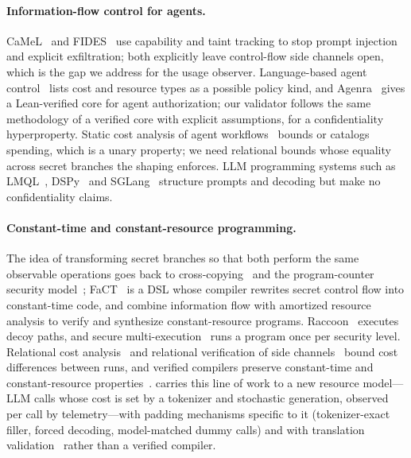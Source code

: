 \paragraph{Information-flow control for agents.} CaMeL~\cite{debenedetti2025camel} and FIDES~\cite{costa2025fides} use capability and taint tracking to stop prompt injection and explicit exfiltration; both explicitly leave control-flow side channels open, which is the gap we address for the usage observer. Language-based agent control~\cite{zhou2026lbac} lists cost and resource types as a possible policy kind, and Agenra~\cite{shivakumar2026agenra} gives a Lean-verified core for agent authorization; our validator follows the same methodology of a verified core with explicit assumptions, for a confidentiality hyperproperty. Static cost analysis of agent workflows~\cite{dickerson2026loom,hou2026ial,khan2026budgets} bounds or catalogs spending, which is a unary property; we need relational bounds whose equality across secret branches the shaping enforces. LLM programming systems such as LMQL~\cite{beurer2023lmql}, DSPy~\cite{khattab2024dspy} and SGLang~\cite{zheng2024sglang} structure prompts and decoding but make no confidentiality claims.

\paragraph{Constant-time and constant-resource programming.} The idea of transforming secret branches so that both perform the same observable operations goes back to cross-copying~\cite{agat2000transforming} and the program-counter security model~\cite{molnar2005pc}; FaCT~\cite{cauligi2019fact} is a DSL whose compiler rewrites secret control flow into constant-time code, and \citet{ngo2017constant} combine information flow with amortized resource analysis to verify and synthesize constant-resource programs. Raccoon~\cite{rane2015raccoon} executes decoy paths, and secure multi-execution~\cite{devriese2010sme} runs a program once per security level. Relational cost analysis~\cite{cicek2017relcost} and relational verification of side channels~\cite{antonopoulos2017blazer,chen2017themis} bound cost differences between runs, and verified compilers preserve constant-time and constant-resource properties~\cite{barthe2020ctcompcert,barthe2021constantresource}. \sys carries this line of work to a new resource model---LLM calls whose cost is set by a tokenizer and stochastic generation, observed per call by telemetry---with padding mechanisms specific to it (tokenizer-exact filler, forced decoding, model-matched dummy calls) and with translation validation~\cite{pnueli1998tv,necula2000tv} rather than a verified compiler.

